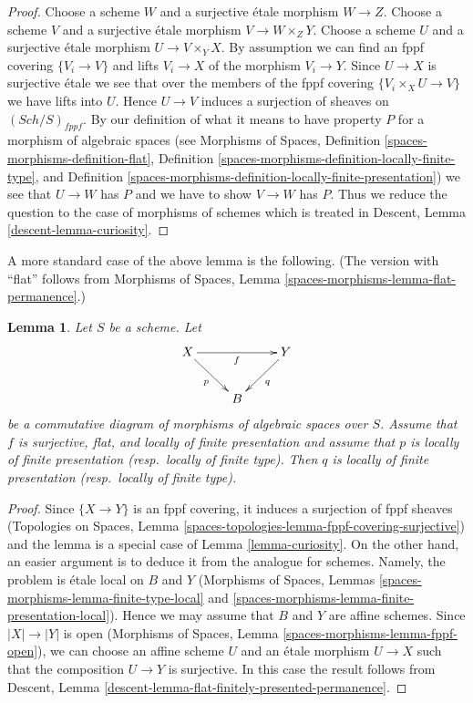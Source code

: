 \documentclass{stacks-project}
\theoremstyle{plain}
\newtheorem{lemma}[subsection]{Lemma}
\theoremstyle{definition}
\theoremstyle{remark}
\numberwithin{equation}{subsection}
\def\Sch{\mathit{Sch}}
\begin{document}
\begin{proof}
Choose a scheme $W$ and a surjective \'etale morphism $W \to Z$.
Choose a scheme $V$ and a surjective \'etale morphism $V \to W \times_Z Y$.
Choose a scheme $U$ and a surjective \'etale morphism $U \to V \times_Y X$.
By assumption we can find an fppf covering $\{V_i \to V\}$ and
lifts $V_i \to X$ of the morphism $V_i \to Y$. Since $U \to X$ is surjective
\'etale we see that over the members of the fppf covering
$\{V_i \times_X U \to V\}$ we have lifts into $U$. Hence $U \to V$ induces
a surjection of sheaves on $(\Sch/S)_{fppf}$.
By our definition of what it means to have property $P$ for a
morphism of algebraic spaces (see
Morphisms of Spaces,
Definition \ref{spaces-morphisms-definition-flat},
Definition \ref{spaces-morphisms-definition-locally-finite-type}, and
Definition \ref{spaces-morphisms-definition-locally-finite-presentation})
we see that $U \to W$ has $P$ and we have to show $V \to W$ has $P$.
Thus we reduce the question to the case of morphisms of schemes
which is treated in
Descent, Lemma \ref{descent-lemma-curiosity}.
\end{proof}

\noindent
A more standard case of the above lemma is the following.
(The version with ``flat'' follows from
Morphisms of Spaces, Lemma \ref{spaces-morphisms-lemma-flat-permanence}.)

\begin{lemma}
\label{lemma-flat-finitely-presented-permanence}
Let $S$ be a scheme. Let
$$
\xymatrix{
X \ar[rr]_f \ar[rd]_p & &
Y \ar[dl]^q \\
& B
}
$$
be a commutative diagram of morphisms of algebraic spaces over $S$.
Assume that $f$ is surjective, flat, and locally of finite presentation
and assume that $p$ is locally of finite presentation (resp.\ locally
of finite type). Then $q$ is locally of finite presentation
(resp.\ locally of finite type).
\end{lemma}

\begin{proof}
Since $\{X \to Y\}$ is an fppf covering, it induces a surjection of
fppf sheaves (Topologies on Spaces, Lemma
\ref{spaces-topologies-lemma-fppf-covering-surjective}) and the
lemma is a special case of Lemma \ref{lemma-curiosity}.
On the other hand, an easier argument is to deduce it from
the analogue for schemes. Namely, the problem is \'etale local
on $B$ and $Y$ (Morphisms of Spaces, Lemmas
\ref{spaces-morphisms-lemma-finite-type-local} and
\ref{spaces-morphisms-lemma-finite-presentation-local}).
Hence we may assume that $B$ and $Y$ are affine
schemes. Since $|X| \to |Y|$ is open
(Morphisms of Spaces, Lemma \ref{spaces-morphisms-lemma-fppf-open}),
we can choose an affine
scheme $U$ and an \'etale morphism $U \to X$ such that the
composition $U \to Y$ is surjective. In this case the result
follows from Descent, Lemma
\ref{descent-lemma-flat-finitely-presented-permanence}.
\end{proof}
\end{document}
